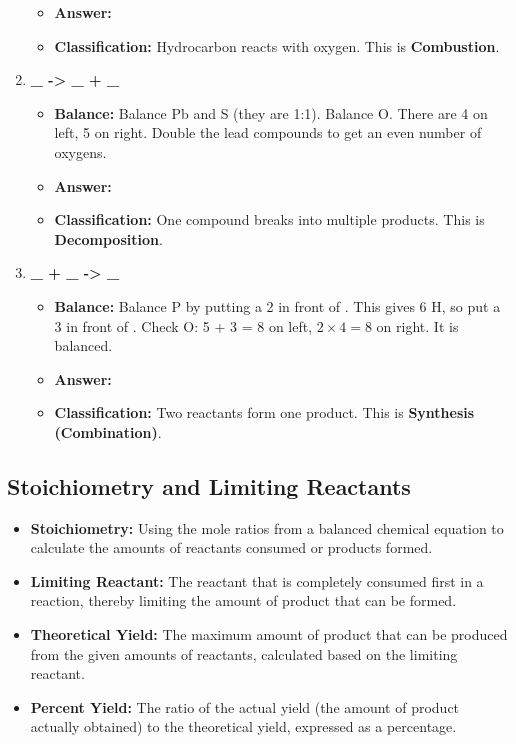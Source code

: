\documentclass{article}
\begin{document}
\begin{enumerate}[itemsep=5pt]
\begin{itemize}
        \item \textbf{Answer:} \textbf{}
        \item \textbf{Classification:} Hydrocarbon reacts with oxygen. This is \textbf{Combustion}.
    \end{itemize}
    \item \textbf{\_  -> \_  + \_ }
    \begin{itemize}
        \item \textbf{Balance:} Balance Pb and S (they are 1:1). Balance O. There are 4 on left, 5 on right. Double the lead compounds to get an even number of oxygens.
        \item \textbf{Answer:} \textbf{}
        \item \textbf{Classification:} One compound breaks into multiple products. This is \textbf{Decomposition}.
    \end{itemize}
    \item \textbf{\_  + \_  -> \_ }
    \begin{itemize}
        \item \textbf{Balance:} Balance P by putting a 2 in front of . This gives 6 H, so put a 3 in front of . Check O: 5 + 3 = 8 on left, \(2 \times 4 = 8\) on right. It is balanced.
        \item \textbf{Answer:} \textbf{}
        \item \textbf{Classification:} Two reactants form one product. This is \textbf{Synthesis (Combination)}.
    \end{itemize}
\end{enumerate}

\subsection*{Stoichiometry and Limiting Reactants}
\begin{itemize}[itemsep=5pt]
    \item \textbf{Stoichiometry:} Using the mole ratios from a balanced chemical equation to calculate the amounts of reactants consumed or products formed.
    \item \textbf{Limiting Reactant:} The reactant that is completely consumed first in a reaction, thereby limiting the amount of product that can be formed.
    \item \textbf{Theoretical Yield:} The maximum amount of product that can be produced from the given amounts of reactants, calculated based on the limiting reactant.
    \item \textbf{Percent Yield:} The ratio of the actual yield (the amount of product actually obtained) to the theoretical yield, expressed as a percentage.
\end{itemize}
\end{document}
